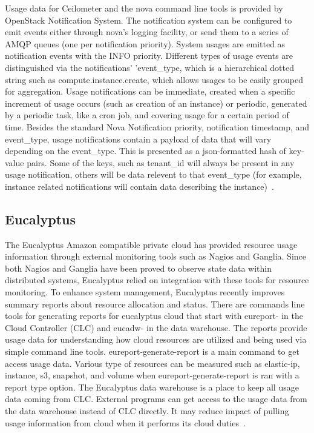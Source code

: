 \documentclass{sig-alternate-05-2015}
\begin{document}
Usage data for Ceilometer and the nova command line tools is provided by OpenStack Notification System. The notification system can be configured to emit events either through nova's logging facility, or send them to a series of AMQP queues (one per notification priority). System usages are emitted as notification events with the INFO priority. Different types of usage events are distinguished via the notifications' 'event\_type, which is a hierarchical dotted string such as compute.instance.create, which allows usages to be easily grouped for aggregation. Usage notifications can be immediate, created when a specific increment of usage occurs (such as creation of an instance) or periodic, generated by a periodic task, like a cron job, and covering usage for a certain period of time. Besides the standard Nova Notification priority, notification timestamp, and event\_type, usage notifications contain a payload of data that will vary depending on the event\_type. This is presented as a json-formatted hash of key-value pairs. Some of the keys, such as tenant\_id will always be present in any usage notification, others will be data relevent to that event\_type (for example, instance related notifications will contain data describing the instance)~\cite{SystemUsageData}.

\subsection{Eucalyptus}

The Eucalyptus Amazon compatible private cloud has provided resource usage information through external monitoring tools such as Nagios and Ganglia. Since both Nagios and Ganglia have been proved to observe state data within distributed systems, Eucalyptus relied on integration with these tools for resource monitoring. To enhance system management, Eucalyptus recently improves summary reports about resource allocation and status. There are commands line tools for generating reports for eucalyptus cloud that start with eureport- in the Cloud Controller (CLC) and eucadw- in the data warehouse. The reports provide usage data for understanding how cloud resources are utilized and being used via simple command line tools. eureport-generate-report is a main command to get access usage data. Various type of resources can be measured such as elastic-ip, instance, s3, snapshot, and volume when eureport-generate-report is ran with a report type option. The Eucalyptus data warehouse is a place to keep all usage data coming from CLC. External programs can get access to the usage data from the data warehouse instead of CLC directly. It may reduce impact of pulling usage information from cloud when it performs its cloud duties~\cite{Euca2ools14}.
\end{document}
